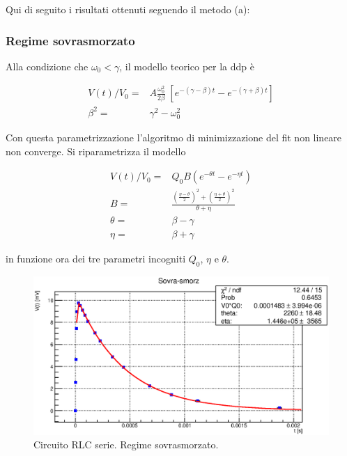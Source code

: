 Qui di seguito i risultati ottenuti seguendo il metodo (a):










\subsubsection{Regime sovrasmorzato}

Alla condizione che $\omega_0 < \gamma$, il modello teorico per la ddp è

\begin{align*}
V(t) / V_{0} =& A \frac{ \omega_0^2}{2\beta} \; [e^{-(\gamma - \beta)t} - e^{-(\gamma + \beta)t} ] \\
\beta^2 =& \gamma^2 - \omega_0^2 
\end{align*}

Con questa parametrizzazione l'algoritmo di minimizzazione del fit non lineare non converge. Si riparametrizza il modello

\begin{align*}
V(t) / V_{0} =&
Q_{0}  B ( e^{-\theta t} - e^{-\eta t} ) \\
B = & \frac{ (\frac{\eta-\theta}{2})^2 + (\frac{\eta+\theta}{2})^2 }
{\theta + \eta} \\
\theta = & \beta-\gamma \\
\eta   = & \beta+\gamma
\end{align*}

in funzione ora dei tre parametri incogniti $Q_0$, $\eta$ e $\theta$.



\begin{figure}
\centering
\includegraphics[scale=0.75]{Grafici/C4_P1_Sovra-smorz.eps}
\caption{
Circuito RLC serie. Regime sovrasmorzato.
}
\label{fig:C4_P1_sovra}
\end{figure}

